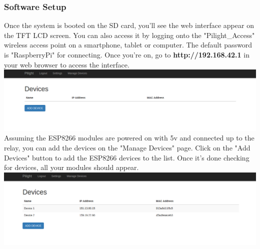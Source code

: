 \subsubsection{Software Setup}
Once the system is booted on the SD card, you'll see the web interface appear on the TFT LCD screen. You can also access it by logging onto the "Pilight\_Access" wireless access point on a smartphone, tablet or computer. The default password is "RaspberryPi" for connecting. Once you're on, go to \textbf{http://192.168.42.1} in your web browser to access the interface.\\
\includegraphics[width=1.0\textwidth]{devices.png}\\
Assuming the ESP8266 modules are powered on with 5v and connected up to the relay, you can add the devices on the "Manage Devices" page. Click on the "Add Devices" button to add the ESP8266 devices to the list. Once it's done checking for devices, all your modules should appear.\\
\includegraphics[width=1.0\textwidth]{added-devices.png}\\
